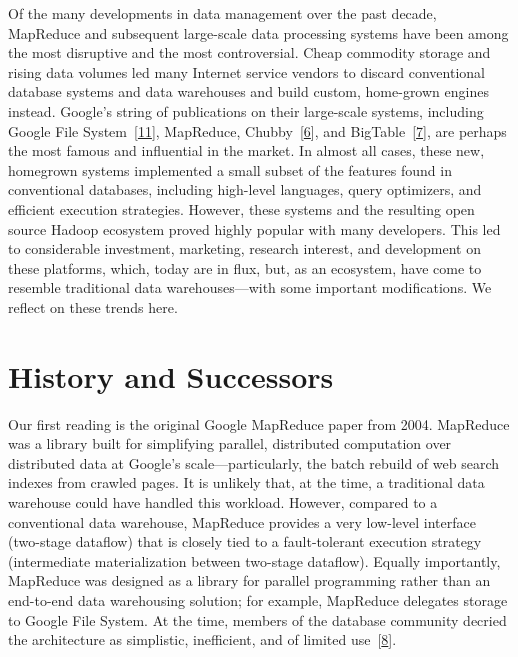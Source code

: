 \documentclass[b5paper,11pt,twoside,openright]{book}
\newcommand\Section[2]{
  \hypertarget{#1}{
    \section{#2}\label{#1}
  }
}
\begin{document}
Of the many developments in data management over the past decade,
MapReduce and subsequent large-scale data processing systems have been
among the most disruptive and the most controversial. Cheap commodity
storage and rising data volumes led many Internet service vendors to
discard conventional database systems and data warehouses and build
custom, home-grown engines instead. Google's string of publications on
their large-scale systems, including Google File
System~{{[}\protect\hyperlink{ref-gfs}{11}{]}}, MapReduce,
Chubby~{{[}\protect\hyperlink{ref-chubby}{6}{]}}, and
BigTable~{{[}\protect\hyperlink{ref-bigtable}{7}{]}}, are perhaps the
most famous and influential in the market. In almost all cases, these
new, homegrown systems implemented a small subset of the features found
in conventional databases, including high-level languages, query
optimizers, and efficient execution strategies. However, these systems
and the resulting open source Hadoop ecosystem proved highly popular
with many developers. This led to considerable investment, marketing,
research interest, and development on these platforms, which, today are
in flux, but, as an ecosystem, have come to resemble traditional data
warehouses---with some important modifications. We reflect on these
trends here.

\Section{history-and-successors}{%
History and Successors
}

Our first reading is the original Google MapReduce paper from 2004.
MapReduce was a library built for simplifying parallel, distributed
computation over distributed data at Google's scale---particularly, the
batch rebuild of web search indexes from crawled pages. It is unlikely
that, at the time, a traditional data warehouse could have handled this
workload. However, compared to a conventional data warehouse, MapReduce
provides a very low-level interface (two-stage dataflow) that is closely
tied to a fault-tolerant execution strategy (intermediate
materialization between two-stage dataflow). Equally importantly,
MapReduce was designed as a library for parallel programming rather than
an end-to-end data warehousing solution; for example, MapReduce
delegates storage to Google File System. At the time, members of the
database community decried the architecture as simplistic, inefficient,
and of limited use~{{[}\protect\hyperlink{ref-mr-majorstep}{8}{]}}.
\end{document}
